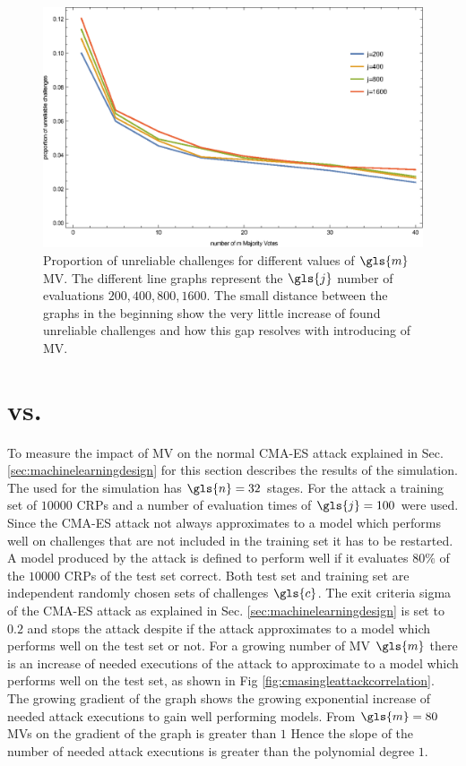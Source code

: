 \begin{figure}[ht]
\includegraphics[width=1.00\textwidth]{images/mv-measurements-unstableChallenges.eps}
\caption[Proportion of unreliable challenges]{Proportion of unreliable challenges for different values of $\gls{m}$ \ac{MV}. The different line graphs represent the $\gls{j}$ number of evaluations $200, 400, 800, 1600$. The small distance between the graphs in the beginning show the very little increase of found unreliable challenges and how this gap resolves with introducing of \ac{MV}.}
\label{fig:cmamajorityvotemeasurementrelation}
\end{figure}


\section{\apufs vs. \mpufs}

To measure the impact of \ac{MV} on the normal \ac{CMA-ES} attack explained in Sec. \ref{sec:machinelearningdesign} for \apufs this section describes the results of the simulation.
The \apuf used for the simulation has $\gls{n} = 32$ stages.
For the attack a training set of $10000$ \acp{CRP} and a number of evaluation times of $\gls{j} = 100$ were used.
Since the \ac{CMA-ES} attack not always approximates to a model which performs well on challenges that are not included in the training set it has to be restarted.
A model produced by the attack is defined to perform well if it evaluates $80 \%$ of the $10000$ \acp{CRP} of the test set correct.
Both test set and training set are independent randomly chosen sets of challenges $\gls{c}$.
The exit criteria sigma of the \ac{CMA-ES} attack as explained in Sec. \ref{sec:machinelearningdesign} is set to $0.2$ and stops the attack despite if the attack approximates to a model which performs well on the test set or not.
For a growing number of \ac{MV} $\gls{m}$ there is an increase of needed executions of the attack to approximate to a model which performs well on the test set, as shown in Fig \ref{fig:cmasingleattackcorrelation}.
The growing gradient of the graph shows the growing exponential increase of needed attack executions to gain well performing models.
From $\gls{m} = 80$ \acp{MV} on the gradient of the graph is greater than $1$ 
Hence the slope of the number of needed attack executions is greater than the polynomial degree $1$.

